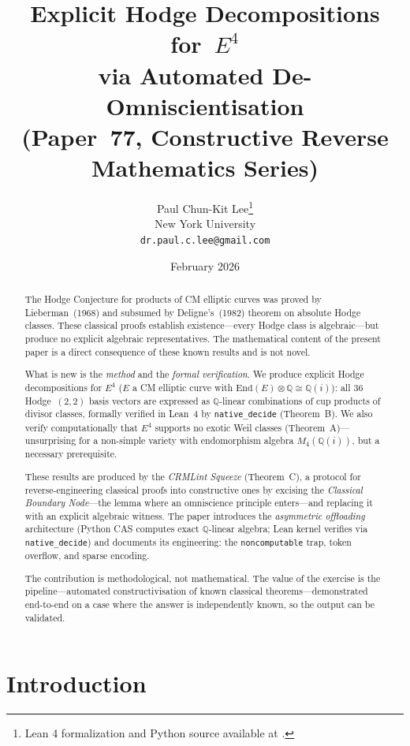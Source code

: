 \documentclass[11pt]{article}
\title{Explicit Hodge Decompositions for~$E^4$\\
  via Automated De-Omniscientisation\\[6pt]
  {\large (Paper~77, Constructive Reverse Mathematics Series)}}
\author{Paul Chun-Kit Lee\thanks{Lean 4 formalization and Python source available at \leanRepo.} \\
New York University \\
\texttt{dr.paul.c.lee@gmail.com}}
\date{February 2026}
\theoremstyle{plain}
\theoremstyle{definition}
\theoremstyle{remark}
\newcommand{\Q}{\mathbb{Q}}
\newcommand{\End}{\mathrm{End}}
\begin{document}
\maketitle

\begin{abstract}
The Hodge Conjecture for products of CM elliptic curves was
proved by Lieberman~(1968) and subsumed by Deligne's~(1982)
theorem on absolute Hodge classes.  These classical proofs
establish existence---every Hodge class is algebraic---but produce
no explicit algebraic representatives.  The mathematical content
of the present paper is a direct consequence of these known
results and is not novel.

What is new is the \emph{method} and the \emph{formal
verification}.  We produce explicit Hodge decompositions for
$E^4$ ($E$ a CM elliptic curve with
$\End(E) \otimes \Q \cong \Q(i)$): all 36 Hodge~$(2,2)$ basis
vectors are expressed as $\Q$-linear combinations of cup products
of divisor classes, formally verified in Lean~4 by
\texttt{native\_decide} (Theorem~B).  We also verify
computationally that $E^4$ supports no exotic Weil classes
(Theorem~A)---unsurprising for a non-simple variety with
endomorphism algebra $M_4(\Q(i))$, but a necessary prerequisite.

These results are produced by the \emph{CRMLint Squeeze}
(Theorem~C), a protocol for reverse-engineering classical proofs
into constructive ones by excising the \emph{Classical Boundary
Node}---the lemma where an omniscience principle
enters---and replacing it with an explicit algebraic witness.
The paper introduces the \emph{asymmetric offloading}
architecture (Python CAS computes exact $\Q$-linear algebra;
Lean kernel verifies via \texttt{native\_decide}) and documents
its engineering: the \texttt{noncomputable} trap, token overflow,
and sparse encoding.

The contribution is methodological, not mathematical.  The
value of the exercise is the pipeline---automated
constructivisation of known classical theorems---demonstrated
end-to-end on a case where the answer is independently
known, so the output can be validated.
\end{abstract}

\tableofcontents

\section{Introduction}\label{sec:intro}
\end{document}
